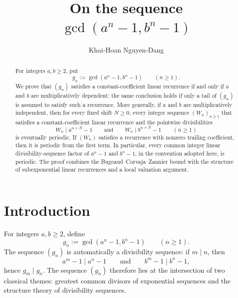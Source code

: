 \documentclass[11pt]{amsart}
\title{On the sequence $\gcd(a^n-1,b^n-1)$}
\author[K.-H. Nguyen-Dang]{Khai-Hoan Nguyen-Dang}
\date{}
\theoremstyle{remark}
\numberwithin{equation}{section}
\begin{document}
\begin{abstract}
For integers $a,b\ge 2$, put
\[
  g_n:=\gcd(a^n-1,b^n-1)\qquad(n\ge 1).
\]
We prove that $(g_n)$ satisfies a constant-coefficient linear recurrence if and only if
$a$ and $b$ are multiplicatively dependent; the same conclusion holds if only a tail
of $(g_n)$ is assumed to satisfy such a recurrence.  More generally, if $a$ and $b$
are multiplicatively independent, then for every fixed shift $N\ge 0$, every
integer sequence $(W_n)_{n\ge 1}$ that satisfies a constant-coefficient linear
recurrence and the pointwise divisibilities
\[
  W_n\mid a^{n+N}-1
  \qquad\text{and}\qquad
  W_n\mid b^{n+N}-1
  \qquad(n\ge 1)
\]
is eventually periodic.  If $(W_n)$ satisfies a recurrence with nonzero trailing
coefficient, then it is periodic from the first term.  In particular, every common
integer linear divisibility-sequence factor of $a^n-1$ and $b^n-1$, in the convention
adopted here, is periodic.  The proof combines the Bugeaud--Corvaja--Zannier bound
with the structure of subexponential linear recurrences and a local valuation
argument.
\end{abstract}

\maketitle

\section{Introduction}\label{sec:introduction}

For integers $a,b\ge 2$, define
\[
  g_n:=\gcd(a^n-1,b^n-1)\qquad(n\ge 1).
\]
The sequence $(g_n)$ is automatically a divisibility sequence: if $m\mid n$, then
\[
  a^m-1\mid a^n-1
  \qquad\text{and}\qquad
  b^m-1\mid b^n-1,
\]
hence $g_m\mid g_n$.  The sequence $(g_n)$ therefore lies at the intersection
of two classical themes: greatest common divisors of exponential sequences and
the structure theory of divisibility sequences.
\end{document}
